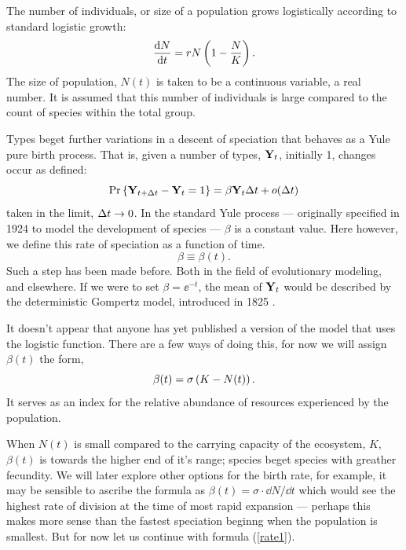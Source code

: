 The number of individuals, or size of a population grows logistically according to standard logistic growth:
$$\displaystyle\frac{{\rm d} N}{{\rm d} t} = rN\left(1-\frac{N}{K}\right).$$
The size of population, $N(t)$ is taken to be a continuous variable, a real number. It is assumed that this number of individuals is large compared to the count of species within the total group.\par

Types beget further variations in a descent of speciation that behaves as a Yule pure birth process. That is, given a number of types, ${{\bf Y}_t}$, initially 1, changes occur as defined: 
$${\text{Pr}\left\{{\bf Y}_{t+\Delta t} - {\bf Y}_t = 1\right\}} = \beta {\bf Y}_t \Delta t + o(\Delta t)$$
taken in the limit, $\Delta t\to 0$. In the standard Yule process --- originally specified in 1924 to model the development of species --- $\beta$ is a constant value. Here however, we define this rate of speciation as a function of time. 
$$\beta \equiv \beta(t).$$
Such a step has been made before. Both in the field of evolutionary modeling, and elsewhere. If we were to set $\beta = \ee^{-t}$, the mean of ${{\bf Y}_t}$ would be described by the deterministic Gompertz model, introduced in 1825 \cite{gompertz1825xxiv}.\par

It doesn't appear that anyone has yet published a version of the model that uses the logistic function. There are a few ways of doing this, for now we will assign $\beta(t)$ the form, 
\begin{equation}
\label{rate1}
\beta(t) = \sigma\left( K - N(t)\right).
\end{equation}
It serves as an index for the relative abundance of resources experienced by the population.\par

When $N(t)$ is small compared to the carrying capacity of the ecosystem, $K$, $\beta(t)$ is towards the higher end of it's range; species beget species with greather fecundity. We will later explore other options for the birth rate, for example, it may be sensible to ascribe the formula as $\beta(t) = \sigma\cdot \dd N/\dd t$ which would see the highest rate of division at the time of most rapid expansion --- perhaps this makes more sense than the fastest speciation beginng when the population is smallest. But for now let us continue with formula (\ref{rate1}). 

